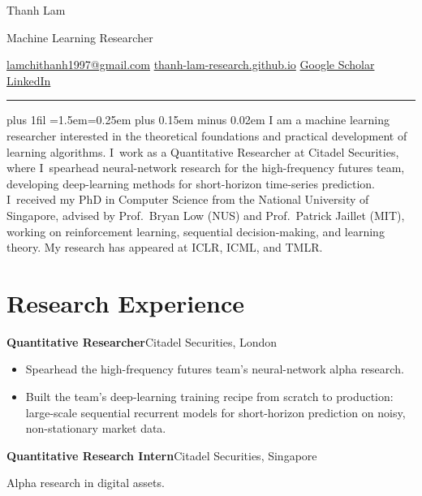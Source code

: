\documentclass[10pt,a4paper]{article}
\newcommand{\sep}{\enspace{\color{faint}\textperiodcentered}\enspace}
\newlength{\datewidth}
\newcommand{\entry}[3]{%
  \settowidth{\datewidth}{\small #3}%
  \begin{minipage}[t]{\dimexpr\linewidth-\datewidth-6mm\relax}\raggedright\leavevmode\textbf{#1}\sep #2\end{minipage}%
  \hfill
  \leavevmode{\color{faint}\small #3}\par}
\newcommand{\detail}[1]{{\color{soft}\small #1}\par\vspace{4pt}}
\begin{document}
{\namefont\fontsize{25}{28}\selectfont Thanh Lam}\par
\vspace{3pt}
{\color{soft}\fontsize{10.5}{12}\selectfont Machine Learning Researcher}\par
\vspace{4pt}
{\small\color{accent}%
\href{mailto:lamchithanh1997@gmail.com}{lamchithanh1997@gmail.com}\sep
\href{https://thanh-lam-research.github.io}{thanh-lam-research.github.io}\sep
\href{https://scholar.google.com/citations?user=EnEvefwAAAAJ&hl=en}{Google Scholar}\sep
\href{https://www.linkedin.com/in/thanhlam26/}{LinkedIn}}\par
\vspace{6pt}
{\color{ink}\rule{\linewidth}{0.6pt}}\par
\vspace{6pt}

{\color{soft}\leftskip=0pt\rightskip=0pt\parfillskip=0pt plus 1fil
\emergencystretch=1.5em\spaceskip=0.25em plus 0.15em minus 0.02em
I am a machine learning researcher interested in the theoretical foundations and practical
development of learning algorithms.
I~work as a Quantitative Researcher at Citadel Securities, where I~spearhead neural-network
research for the high-frequency futures team, developing deep-learning methods for
short-horizon time-series prediction.
I~received my PhD in Computer Science from the National University of Singapore,
advised by Prof.~Bryan Low (NUS) and Prof.~Patrick Jaillet (MIT), working on
reinforcement learning, sequential decision-making, and learning theory. My research
has appeared at ICLR, ICML, and TMLR.\par}

\section{Research Experience}
\entry{Quantitative Researcher}{Citadel Securities, London}{2023 – Present}
{\color{soft}\small
\begin{itemize}
  \item Spearhead the high-frequency futures team's neural-network alpha research.
  \item Built the team's deep-learning training recipe from scratch to production: large-scale sequential recurrent models for short-horizon prediction on noisy, non-stationary market data.
\end{itemize}}
\vspace{4pt}
\entry{Quantitative Research Intern}{Citadel Securities, Singapore}{2022}
\detail{Alpha research in digital assets.}
\end{document}

